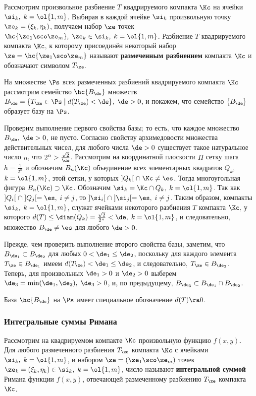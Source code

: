 \documentclass[a4paper]{article}
\begin{document}
Рассмотрим произвольное разбиение $T$ квадрируемого компакта $\Kc$
на ячейки $\si_k, \; k=\ol{1,m}$. Выбирая в каждой ячейке $\si_k$
произвольную точку $\ze_k=(\xi_k,\eta_k)$, получаем набор $\ze$
точек $\hc{\ze_1\sco\ze_m}, \; \ze_k\in\si_k, \; k=\ol{1,m}$.
Разбиение $T$ квадрируемого компакта $\Kc$, к которому присоединён
некоторый набор $\ze=\hc{\ze_1\sco\ze_m}$ называют
\textbf{размеченным разбиением} компакта $\Kc$ и обозначают символом
$T_{\ze}$.

На множестве $\Ps$ всех размеченных разбиений квадрируемого компакта
$\Kc$ рассмотрим семейство $\hc{B_{\de}}$ множеств $B_{\de} =
\{T_{\ze}\in\Ps \; | \; d(T_{\ze}) < \de\}, \; \de>0$, и покажем,
что семейство $\{B_{\de}\}$ образует базу на $\Ps$.

Проверим выполнение первого свойства базы; то есть, что каждое
множество $B_{\de}, \; \de>0$, не пусто. Согласно свойству
архимедовости множества действительных чисел, для любого числа
$\de>0$ существует такое натуральное число $n$, что
$2^n>\frac{\sqrt2}{\de}$. Рассмотрим на координатной плоскости $\Pi$
сетку шага $h=\frac1{2^n}$ и обозначим $B_n(\Kc)$ объединение всех
элементарных квадратов $Q_k$, $k=\ol{1,m}$, этой сетки, у которых
$]Q_k[ \; \cap \; \Kc\ne\es$. Тогда многоугольная фигура
$B_n(\Kc)\supset\Kc$. Обозначим $\si_k=\Kc\cap Q_k, \; k=\ol{1,m}$.
Так как $]Q_i[ \; \cap \; ]Q_j[=\es, \; i\ne j$, то $]\si_i[ \; \cap
\; ]\si_j[=\es, \; i\ne j$. Таким образом, компакты $\si_k, \;
k=\ol{1,m}$, служат ячейками некоторого разбиения $T$ компакта
$\Kc$, у которого $d(T)\le \diam(Q_k)=\frac{\sqrt2}{2^n}<\de, \;
k=\ol{1,m}$, и следовательно, множество $B_{\de}\ne\es$ для любого
$\de>0$.

Прежде, чем проверить выполнение второго свойства базы, заметим, что
$B_{\de_1}\subset B_{\de_2}$ для любых $0<\de_1\le\de_2$, поскольку
для каждого элемента $T_{\ze}\in B_{\de_1}$ имеем
$d(T_{\ze})<\de_1\le\de_2$, и следовательно, $T_{\ze}\in B_{\de_2}$.
Теперь, для произвольных $\de_1>0$ и $\de_2>0$ выберем
$\de_3=\min(\de_1,\de_2), \; \de_3>0$, и, по предыдущему,
$B_{\de_3}\subset B_{\de_1}\cap B_{\de_2}$.

База $\hc{B_{\de}}$ на $\Ps$ имеет специальное обозначение
$d(T)\ra0$.

\subsubsection{Интегральные суммы Римана}

Рассмотрим на квадрируемом компакте $\Kc$ произвольную функцию
$f(x,y)$. Для любого размеченного разбиения $T_{\ze}$ компакта $\Kc$
с ячейками $\si_k, \; k=\ol{1,m}$, и набором $\ze=(\ze_1\sco\ze_m)$
точек $\ze_k=(\xi_k,\eta_k)\in\si_k, \; k=\ol{1,m}$, число
 называют
\textbf{интегральной суммой} Римана функции $f(x,y)$, отвечающей
размеченному разбиению $T_{\ze}$ компакта $\Kc$.
\end{document}
